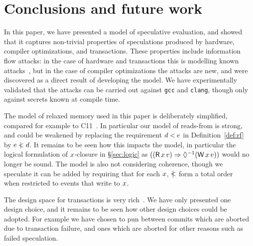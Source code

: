 \section{Conclusions and future work}

In this paper, we have presented a model of speculative evaluation, and
showed that it captures non-trivial properties of speculations produced
by hardware, compiler optimizations, and transactions. These properties
include information flow attacks: in the case of hardware and transactions
this is modelling known attacks~\cite{DBLP:journals/corr/abs-1801-01203,DBLP:conf/uss/DisselkoenKPT17},
but in the case of compiler optimizations the attacks are new, and were
discovered as a direct result of developing the model. We have experimentally
validated that the attacks can be carried out against \verb|gcc| and \verb|clang|,
though only against secrets known at compile time.

The model of relaxed memory used in this paper is deliberately
simplified, compared for example to
C11~\cite{Boehm:2008:FCC:1375581.1375591,Batty:2011:MCC:1926385.1926394}.
In particular our model of reads-from is strong, and could be weakened
by replacing the requirement $d<e$ in Definition~\ref{def:rf}
by $e\mathrel{\,\mid\!\!\!<}d$. It remains to be seen how this impacts the model,
in particular the logical formulation of $x$-closure in
\S\ref{sec:logic} as
$((\DR{\aLoc}{\aVal}) \Rightarrow \once(\DW{\aLoc}{\aVal}))$
would no longer be sound.
The model is also not considering coherence, though we speculate it
can be added by requiring that for each $x$, $\mathrel{\,\mid\!\!\!<}$ form a total
order when restricted to events that write to $x$.

The design space for transactions is very rich~\cite{DBLP:journals/pacmpl/DongolJR18}.
We have only presented one design choice, and it remains to be seen how other
design choices could be adopted. For example we have chosen to pun between
commits which are aborted due to transaction failure, and ones which are aborted
for other reasons such as failed speculation.


